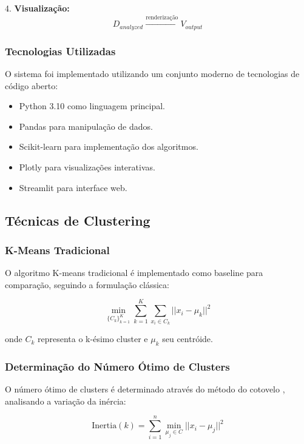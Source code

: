 \documentclass[conference]{IEEEtran}
\begin{document}
4. \textbf{Visualização:}
\begin{equation}
D_{analyzed} \xrightarrow{\text{renderização}} V_{output}
\end{equation}

\subsubsection{Tecnologias Utilizadas}
O sistema foi implementado utilizando um conjunto moderno de tecnologias de código aberto:

\begin{itemize}
\item Python 3.10 como linguagem principal.
\item Pandas para manipulação de dados.
\item Scikit-learn para implementação dos algoritmos.
\item Plotly para visualizações interativas.
\item Streamlit para interface web.
\end{itemize}

\subsection{Técnicas de Clustering}

\subsubsection{K-Means Tradicional}
O algoritmo K-means tradicional \cite{b3} é implementado como baseline para comparação, seguindo a formulação clássica:

\begin{equation}
\min_{\{C_k\}_{k=1}^K} \sum_{k=1}^K \sum_{x_i \in C_k} ||x_i - \mu_k||^2
\end{equation}

onde $C_k$ representa o k-ésimo cluster e $\mu_k$ seu centróide.

\subsubsection{Determinação do Número Ótimo de Clusters}
O número ótimo de clusters é determinado através do método do cotovelo \cite{b4}, analisando a variação da inércia:

\begin{equation}
\text{Inertia}(k) = \sum_{i=1}^n \min_{\mu_j \in C} ||x_i - \mu_j||^2
\end{equation}
\end{document}

